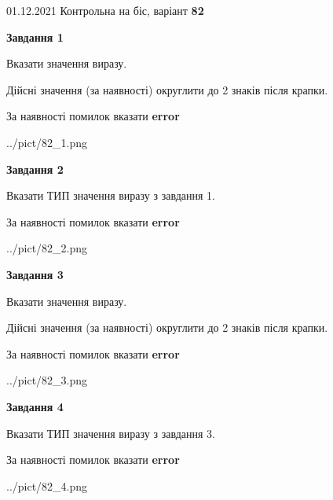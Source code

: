 \documentclass[11pt, ukrainian]{article}
\begin{document}
{01.12.2021 Контрольна на біс, варіант  \No \textbf { 82 }\par}
{
\begin {large}
{\begin {center}\textbf{Завдання 1}\end {center}}\par
Вказати значення виразу. \par
Дійсні значення (за наявності) округлити до 2 знаків після крапки. \par
За наявності помилок вказати \textbf{error}

\begin{center}
	{../pict/82_1.png}
\end{center}
\newpage

{\begin {center}\textbf{Завдання 2}\end {center}}\par
Вказати ТИП значення виразу з завдання 1. \par
За наявності помилок вказати \textbf{error}

\begin{center}
	{../pict/82_2.png}
\end{center}
\newpage

{\begin {center}\textbf{Завдання 3}\end {center}}\par
Вказати значення виразу. \par
Дійсні значення (за наявності) округлити до 2 знаків після крапки. \par
За наявності помилок вказати \textbf{error}

\begin{center}
	{../pict/82_3.png}
\end{center}
\newpage

{\begin {center}\textbf{Завдання 4}\end {center}}\par
Вказати ТИП значення виразу з завдання 3. \par
За наявності помилок вказати \textbf{error}

\begin{center}
	{../pict/82_4.png}
\end{center}
\newpage


\end{large}}
\end{document}
